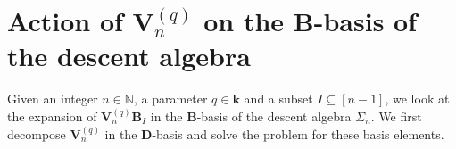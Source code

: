 \documentclass[revision]{FPSAC2025}
\newcommand{\NN}{\mathbb{N}} %
\newcommand{\kk}{\mathbf{k}} %
\begin{document}

\section{Action of $\mathbf{V}_n^{(q)}$ on the $\mathbf{B}$-basis of the descent algebra}

Given an integer $n \in \NN$, a parameter $q \in \kk$ and a subset $I \subseteq [n-1]$, we look at the expansion of $\mathbf{V}_n^{(q)} \mathbf{B}_I$ in the $\mathbf{B}$-basis of the descent algebra $\Sigma_n$. We first decompose $\mathbf{V}_n^{(q)}$  in the $\mathbf{D}$-basis and solve the problem for these basis elements.
\end{document}
